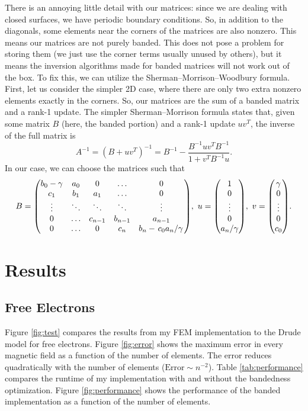 \documentclass[12pt]{article}
\begin{document}
There is an annoying little detail with our matrices: since we are dealing with closed surfaces,
we have periodic boundary conditions. So, in addition to the diagonals, some elements near the
corners of the matrices are also nonzero. This means our matrices are not purely banded. This
does not pose a problem for storing them (we just use the corner terms usually unused by others),
but it means the inversion algorithms made for banded matrices will not work out of the box. To fix
this, we can utilize the Sherman--Morrison--Woodbury formula. First, let us consider the simpler 2D
case, where there are only two extra nonzero elements exactly in the corners. So, our matrices are
the sum of a banded matrix and a rank-1 update. The simpler Sherman--Morrison formula states that,
given some matrix $B$ (here, the banded portion) and a rank-1 update $uv^T$, the inverse of the full
matrix is
\begin{equation}
    A^{-1} = (B + uv^T)^{-1} = B^{-1} - \frac{B^{-1}uv^TB^{-1}}{1 + v^TB^{-1}u}.
\end{equation}
In our case, we can choose the matrices such that
\begin{equation}
    B = \mqty(b_0 - \gamma & a_0 & 0 & \dots & 0 \\
          c_1 & b_1 & a_1 & \dots & 0 \\
          \vdots & \ddots & \ddots & \ddots & \vdots \\
          0 & \dots & c_{n-1} & b_{n-1} & a_{n-1} \\
          0 & \dots & 0 & c_n & b_n - \flatfrac{c_0a_n}{\gamma}),\ 
    u = \mqty(1 \\ 0 \\ \vdots \\ 0 \\ a_n/\gamma),\ 
    v = \mqty(\gamma \\ 0 \\ \vdots \\ 0 \\ c_0).
\end{equation}

\section{Results}
\subsection{Free Electrons}

Figure \ref{fig:test} compares the results from my FEM implementation to the Drude model for free
electrons. Figure \ref{fig:error} shows the maximum error in every magnetic field as a function of
the number of elements. The error reduces quadratically with the number of elements
($\mathrm{Error}\sim n^{-2}$). Table \ref{tab:performance} compares the runtime of my implementation
with and without the bandedness optimization. Figure \ref{fig:performance} shows the performance
of the banded implementation as a function of the number of elements.
\end{document}
